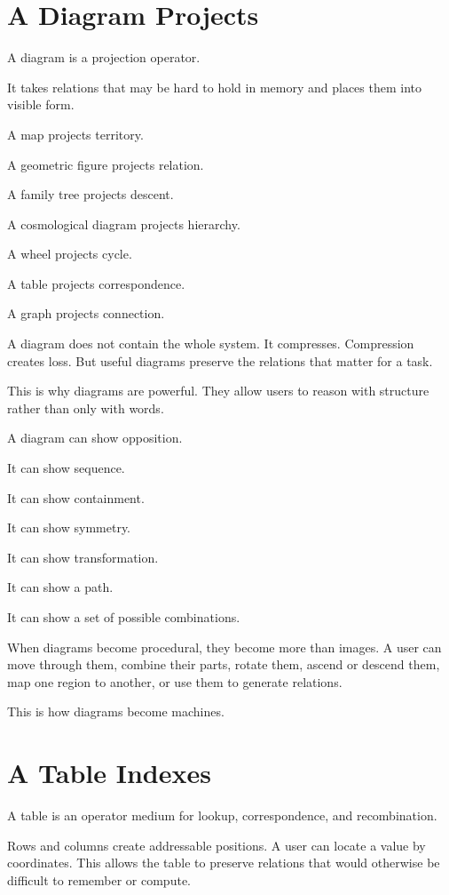 \documentclass[11pt]{book}
\begin{document}
\section{A Diagram Projects}

A diagram is a projection operator.

It takes relations that may be hard to hold in memory and places them into visible form.

A map projects territory.

A geometric figure projects relation.

A family tree projects descent.

A cosmological diagram projects hierarchy.

A wheel projects cycle.

A table projects correspondence.

A graph projects connection.

A diagram does not contain the whole system. It compresses. Compression creates loss. But useful diagrams preserve the relations that matter for a task.

This is why diagrams are powerful. They allow users to reason with structure rather than only with words.

A diagram can show opposition.

It can show sequence.

It can show containment.

It can show symmetry.

It can show transformation.

It can show a path.

It can show a set of possible combinations.

When diagrams become procedural, they become more than images. A user can move through them, combine their parts, rotate them, ascend or descend them, map one region to another, or use them to generate relations.

This is how diagrams become machines.

\section{A Table Indexes}

A table is an operator medium for lookup, correspondence, and recombination.

Rows and columns create addressable positions. A user can locate a value by coordinates. This allows the table to preserve relations that would otherwise be difficult to remember or compute.
\end{document}
